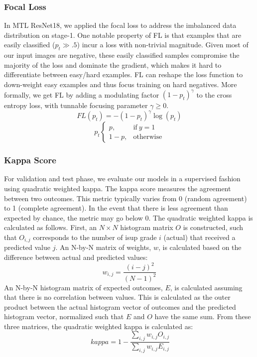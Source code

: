 \documentclass[10pt,twocolumn,letterpaper]{article}
\begin{document}
\subsubsection{Focal Loss}
In MTL ResNet18, we applied the focal loss to address the imbalanced data distribution on stage-1. One notable property of FL is that examples that are easily classified ($p_t \gg .5$) incur a loss with non-trivial magnitude. 
Given most of our input images are negative, these easily classified samples compromise the majority of the loss and dominate the gradient, which makes it hard to differentiate between easy/hard examples. FL can reshape the loss function to down-weight easy examples and thus focus training on hard negatives. More formally, we get FL by adding a modulating factor $(1-p_t)^\gamma$ to the cross entropy loss, with tunnable focusing parameter $\gamma \ge 0$.
\begin{equation}
FL(p_t)=-(1-p_t)^\gamma \log(p_t)
\end{equation}
\begin{equation}
 p_t
   \begin{cases}
      p, &\text{if}\ y=1 \\
      1-p, &\text{otherwise}
    \end{cases}
\end{equation}

\subsubsection{Kappa Score}
For validation and test phase, we evaluate our models in a supervised fashion using quadratic weighted kappa. The kappa score measures the agreement between two outcomes. This metric typically varies from 0 (random agreement) to 1 (complete agreement). In the event that there is less agreement than expected by chance, the metric may go below 0.
The quadratic weighted kappa is calculated as follows. First, an $N \times N$ histogram matrix $O$ is constructed, such that $O_{i,j}$ corresponds to the number of isup grade $i$ (actual) that received a predicted value $j$. An N-by-N matrix of weights, $w$,
is calculated based on the difference between actual and predicted values:
\begin{equation}
w_{i,j}=\frac{(i-j)^2}{(N-1)^2}
\end{equation}
An N-by-N histogram matrix of expected outcomes, $E$, is calculated assuming that there is no correlation between values. This is calculated as the outer product between the actual histogram vector of outcomes and the predicted histogram vector, normalized such that $E$ and $O$ have the same sum.
From these three matrices, the quadratic weighted kappa is calculated as: 
\begin{equation}
\ kappa=1-\frac{\sum_{i,j}w_{i,j}O_{i,j}}{\sum_{i,j}w_{i,j}E_{i,j}}
\end{equation}
\end{document}
